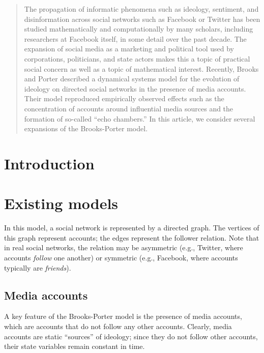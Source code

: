 \documentclass[10pt]{amsart}
\title{}
\author{Dylan Murphy}
\date{\today}
\begin{document}
\maketitle

\begin{abstract}
The propagation of informatic phenomena such as ideology, sentiment, and disinformation across social networks such as Facebook or Twitter has been studied mathematically and computationally by many scholars, including researchers at Facebook itself, in some detail over the past decade.
The expansion of social media as a marketing and political tool used by corporations, politicians, and state actors makes this a topic of practical social concern as well as a topic of mathematical interest.
Recently, Brooks and Porter\cite{HZBMAP2020} described a dynamical systems model for the evolution of ideology on directed social networks in the presence of media accounts.
Their model reproduced empirically observed effects such as the concentration of accounts around influential media sources and the formation of so-called ``echo chambers.''
In this article, we consider several expansions of the Brooks-Porter model.
\end{abstract}

\section{Introduction}



\section{Existing models}

In this model, a social network is represented by a directed graph.
The vertices of this graph represent accounts; the edges represent the follower relation.
Note that in real social networks, the relation may be asymmetric (e.g., Twitter, where accounts \emph{follow} one another) or symmetric (e.g., Facebook, where accounts typically are \emph{friends}).

\subsection{Media accounts}

A key feature of the Brooks-Porter model is the presence of media accounts, which are accounts that do not follow any other accounts.
Clearly, media accounts are static ``sources'' of ideology; since they do not follow other accounts, their state variables remain constant in time.
\end{document}
